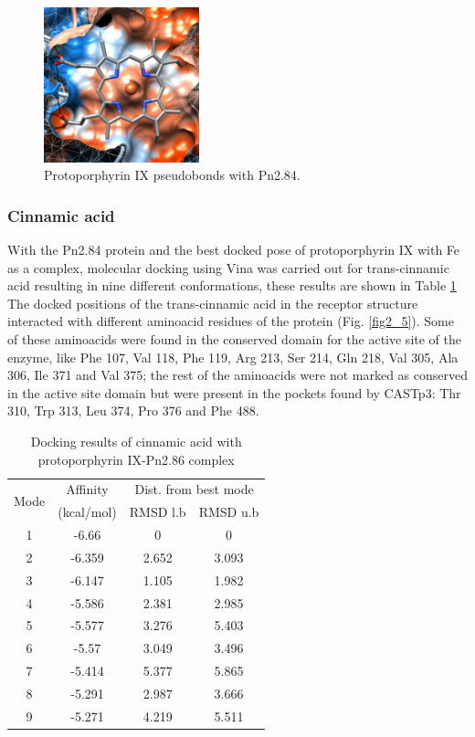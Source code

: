 \documentclass[12pt]{article}
\begin{document}
	\FloatBarrier
	
	\FloatBarrier
	\begin{figure}[h!]
		\centering
		\includegraphics[width=0.4\textwidth]{../2/Dock/chimera.png}
		\caption{Protoporphyrin IX pseudobonds with Pn2.84.}
		\label{fig2_4}
	\end{figure}
	\FloatBarrier
	
	
	\subsubsection{Cinnamic acid}
	
	With the Pn2.84 protein and the best docked pose of protoporphyrin IX with Fe as a complex, molecular docking using Vina was carried out for trans-cinnamic acid resulting in nine different conformations, these results are shown in Table \ref{table2_2} The docked positions of the trans-cinnamic acid in the receptor structure interacted with different aminoacid residues of the protein (Fig. \ref{fig2_5}). Some of these aminoacids were found in the conserved domain for the active site of the enzyme, like Phe 107, Val 118, Phe 119, Arg 213, Ser 214, Gln 218, Val 305, Ala 306, Ile 371 and Val 375; the rest of the aminoacids were not marked as conserved in the active site domain but were present in the pockets found by CASTp3: Thr 310, Trp 313, Leu 374, Pro 376 and Phe 488.
	
	\begin{table}[h!]
		\centering
		\caption{Docking results of cinnamic acid with protoporphyrin IX-Pn2.86 complex}
		\label{table2_2}
		\begin{tabular}{cccc}
			\toprule
			\multirow{2}{*}{Mode} & Affinity & \multicolumn{2}{c}{Dist. from best mode}\\
			&  (kcal/mol) & RMSD l.b & RMSD u.b\\
			\midrule
			1 &  -6.66   &       0   &         0\\
			2 & -6.359   &   2.652   &     3.093\\
			3 & -6.147   &   1.105   &     1.982\\
			4 & -5.586   &   2.381   &     2.985\\
			5 & -5.577   &   3.276   &     5.403\\
			6 &  -5.57   &   3.049   &     3.496\\
			7 & -5.414   &   5.377   &     5.865\\
			8 & -5.291   &   2.987   &     3.666\\
			9 & -5.271   &   4.219   &     5.511\\
			\bottomrule
			
		\end{tabular}
	\end{table}
\end{document}
